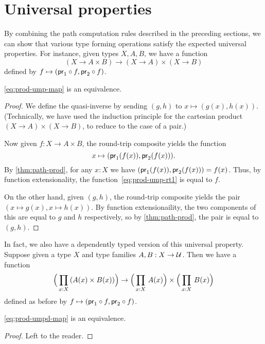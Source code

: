 \section{Universal properties}
\label{sec:universal-properties}

By combining the path computation rules described in the preceding sections, we can show that various type forming operations satisfy the expected universal properties.
For instance, given types $X,A,B$, we have a function
\begin{equation}\label{eq:prod-ump-map}
  (X\to A\times B) \to (X\to A)\times (X\to B)
\end{equation}
defined by $f \mapsto (\mathsf{pr}_{1} \circ f, \mathsf{pr}_{2}\circ f)$.

\begin{thm}\label{thm:prod-ump}
  \eqref{eq:prod-ump-map} is an equivalence.
\end{thm}
\begin{proof}
  We define the quasi-inverse by sending $(g,h)$ to $x\mapsto (g(x),h(x))$.
  (Technically, we have used the induction principle for the cartesian product $(X\to A)\times (X\to B)$, to reduce to the case of a pair.)

  Now given $f:X\to A\times B$, the round-trip composite yields the function
  \begin{equation}
    x\mapsto (\proj1(f(x)),\proj2(f(x))).\label{eq:prod-ump-rt1}
  \end{equation}
  By \autoref{thm:path-prod}, for any $x:X$ we have $(\mathsf{pr}_{1}(f(x)),\mathsf{pr}_{2}(f(x))) = f(x)$.
  Thus, by function extensionality, the function~\eqref{eq:prod-ump-rt1} is equal to $f$.

  On the other hand, given $(g,h)$, the round-trip composite yields the pair $(x\mapsto g(x),x\mapsto h(x))$.
  By function extensionaility, the two components of this are equal to $g$ and $h$ respectively, so by \autoref{thm:path-prod}, the pair is equal to $(g,h)$.
\end{proof}

In fact, we also have a dependently typed version of this universal property.
Suppose given a type $X$ and type families $A,B:X\to \mathcal{U}$.
Then we have a function
\begin{equation}\label{eq:prod-umpd-map}
  \Big(\prd{x:X} (A(x)\times B(x))\Big) \to \Big(\prd{x:X} A(x)\Big) \times \Big(\prd{x:X} B(x)\Big)
\end{equation}
defined as before by $f \mapsto (\mathsf{pr}_{1} \circ f, \mathsf{pr}_{2}\circ f)$.

\begin{thm}\label{thm:prod-umpd}
  \eqref{eq:prod-umpd-map} is an equivalence.
\end{thm}
\begin{proof}
  Left to the reader.
\end{proof}

